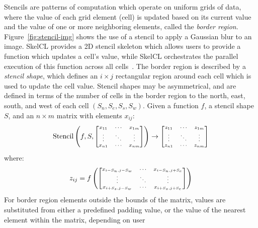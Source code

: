   Stencils are patterns of computation which operate on uniform grids of
  data, where the value of each grid element (cell) is updated based on
  its current value and the value of one or more neighboring elements,
  called the \emph{border region}. Figure~\ref{fig:stencil-img} shows
  the use of a stencil to apply a Gaussian blur to an image. SkelCL
  provides a 2D stencil skeleton which allows users to provide a
  function which updates a cell's value, while SkelCL orchestrates the
  parallel execution of this function across all
  cells~\cite{Steuwer2014a}. The border region is described by a
  \emph{stencil shape}, which defines an $i \times j$ rectangular region
  around each cell which is used to update the cell value. Stencil
  shapes may be asymmetrical, and are defined in terms of the number of
  cells in the border region to the north, east, south, and west of each
  cell $(S_n, S_e, S_s, S_w)$. Given a function $f$, a stencil shape $S$, and an $n \times m$
  matrix with elements $x_{ij}$:
  \begin{equation}
    \scriptsize
    \stencil \left( f, S,
    \begin{bmatrix}
      x_{11} & \cdots & x_{1m} \\
      \vdots & \ddots & \vdots \\
      x_{n1} & \cdots & x_{nm}
    \end{bmatrix} \right)
    \to
    \begin{bmatrix}
      z_{11} & \cdots & z_{1m} \\
      \vdots & \ddots & \vdots \\
      z_{n1} & \cdots & z_{nm}
    \end{bmatrix}
  \end{equation}
  where:
  \begin{equation}
    \scriptsize
    z_{ij} = f \left(
    \begin{bmatrix}
      x_{i-S_n,j-S_w} & \cdots & x_{i-S_n,j+S_e} \\
      \vdots & \ddots & \vdots \\
      x_{i+S_s,j-S_w} & \cdots & x_{i+S_s,j+S_e}
    \end{bmatrix} \right)
  \end{equation}
  For border region elements outside the bounds of the matrix, values
  are substituted from either a predefined padding value, or the value
  of the nearest element within the matrix, depending on user
